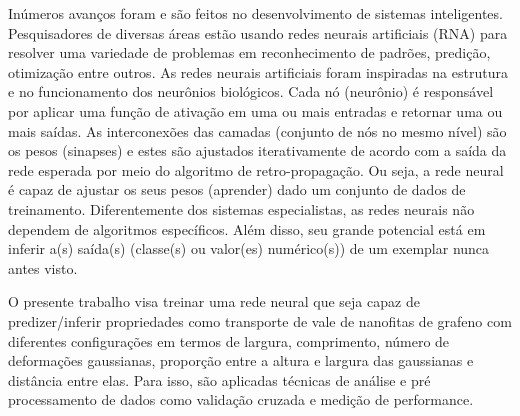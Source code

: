 Inúmeros avanços foram e são feitos no desenvolvimento de sistemas inteligentes. Pesquisadores de diversas áreas estão usando redes neurais artificiais (RNA) para resolver uma variedade de problemas em reconhecimento de padrões, predição, otimização entre outros.  As redes neurais artificiais foram inspiradas na estrutura e no funcionamento dos neurônios biológicos. Cada nó (neurônio) é responsável por aplicar uma função de ativação em uma ou mais entradas e retornar uma ou mais saídas. As interconexões das camadas (conjunto de nós no mesmo nível) são os pesos (sinapses) e estes são ajustados iterativamente de acordo com a saída da rede esperada por meio do algoritmo de retro-propagação. Ou seja, a rede neural é capaz de ajustar os seus pesos (aprender) dado um conjunto de dados de treinamento. Diferentemente dos sistemas especialistas, as redes neurais não dependem de algoritmos específicos. Além disso, seu grande potencial está em inferir a(s) saída(s) (classe(s) ou valor(es) numérico(s)) de um exemplar nunca antes visto.

O presente trabalho visa treinar uma rede neural que seja capaz de predizer/inferir propriedades como transporte de vale de nanofitas de grafeno com diferentes configurações em termos de largura, comprimento, número de deformações gaussianas, proporção entre a altura e largura das gaussianas e distância entre elas. Para isso, são aplicadas técnicas de análise e pré processamento de dados como validação cruzada e medição de performance.